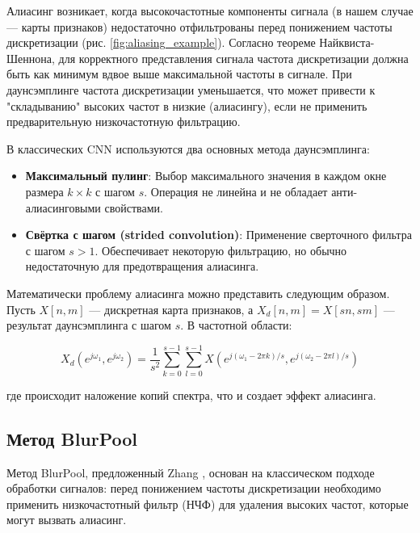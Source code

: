 Алиасинг возникает, когда высокочастотные компоненты сигнала (в нашем случае — карты признаков) недостаточно отфильтрованы перед понижением частоты дискретизации (рис. \ref{fig:aliasing_example}). Согласно теореме Найквиста-Шеннона, для корректного представления сигнала частота дискретизации должна быть как минимум вдвое выше максимальной частоты в сигнале. При даунсэмплинге частота дискретизации уменьшается, что может привести к "складыванию" высоких частот в низкие (алиасингу), если не применить предварительную низкочастотную фильтрацию.

В классических CNN используются два основных метода даунсэмплинга:

\begin{itemize}
    \item \textbf{Максимальный пулинг}: Выбор максимального значения в каждом окне размера $k \times k$ с шагом $s$. Операция не линейна и не обладает анти-алиасинговыми свойствами.
    
    \item \textbf{Свёртка с шагом (strided convolution)}: Применение сверточного фильтра с шагом $s > 1$. Обеспечивает некоторую фильтрацию, но обычно недостаточную для предотвращения алиасинга.
\end{itemize}

Математически проблему алиасинга можно представить следующим образом. Пусть $X[n,m]$ — дискретная карта признаков, а $X_d[n,m] = X[sn, sm]$ — результат даунсэмплинга с шагом $s$. В частотной области:

\begin{equation}
X_d(e^{j\omega_1}, e^{j\omega_2}) = \frac{1}{s^2} \sum_{k=0}^{s-1} \sum_{l=0}^{s-1} X(e^{j(\omega_1 - 2\pi k)/s}, e^{j(\omega_2 - 2\pi l)/s})
\end{equation}

где происходит наложение копий спектра, что и создает эффект алиасинга.

\subsection{Метод BlurPool}
\label{theory:anti_aliasing:blurpool}

Метод BlurPool, предложенный Zhang \cite{Zhang2019}, основан на классическом подходе обработки сигналов: перед понижением частоты дискретизации необходимо применить низкочастотный фильтр (НЧФ) для удаления высоких частот, которые могут вызвать алиасинг.

